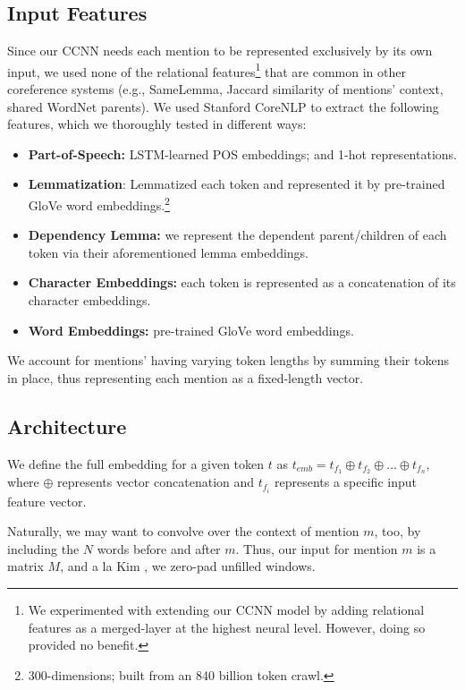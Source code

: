 \documentclass[11pt,a4paper]{article}
\begin{document}
\subsection{Input Features}
\label{sec:features}
Since our CCNN needs each mention to be represented exclusively by its own input, we used none of the relational features\footnote{We experimented with extending our CCNN model by adding relational features as a merged-layer at the highest neural level.  However, doing so provided no benefit.} that are common in other coreference systems (e.g., SameLemma, Jaccard similarity of mentions' context, shared WordNet parents).  We used Stanford CoreNLP \cite{manning-EtAl:2014:P14-5} to extract the following features, which we thoroughly tested in different ways: %
\begin{itemize}
  \item \textbf{Part-of-Speech:} LSTM-learned POS embeddings; and 1-hot representations.
  \item \textbf{Lemmatization}: Lemmatized each token and represented it by pre-trained GloVe \cite{pennington2014glove} word embeddings.\footnote{300-dimensions; built from an 840 billion token crawl.}
  \item \textbf{Dependency Lemma:} we represent the dependent parent/children of each token via their aforementioned lemma embeddings.
  \item \textbf{Character Embeddings:} each token is represented as a concatenation of its character embeddings.
  \item \textbf{Word Embeddings:} pre-trained GloVe word embeddings.
\end{itemize}
We account for mentions' having varying token lengths by summing their tokens in place, thus representing each mention as a fixed-length vector.

\subsection{Architecture}
We define the full embedding for a given token $t$ as $t_{emb} = t_{f_{1}} \oplus t_{f_{2}} \oplus \ldots \oplus t_{f_{n}},$ where $\oplus$ represents vector concatenation and $t_{f_{i}}$ represents a specific input feature vector.

Naturally, we may want to convolve over the context of mention $m$, too, by including the $N$ words before and after $m$.  Thus, our input for mention $m$ is a matrix $M$, and a la Kim , we zero-pad unfilled windows.
\end{document}
